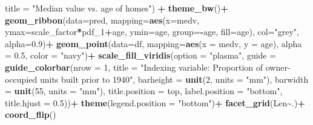 \documentclass[
]{article}
\newenvironment{Shaded}{\begin{snugshade}}{\end{snugshade}}
\newcommand{\AttributeTok}[1]{\textcolor[rgb]{0.13,0.29,0.53}{#1}}
\newcommand{\DecValTok}[1]{\textcolor[rgb]{0.00,0.00,0.81}{#1}}
\newcommand{\FloatTok}[1]{\textcolor[rgb]{0.00,0.00,0.81}{#1}}
\newcommand{\FunctionTok}[1]{\textcolor[rgb]{0.13,0.29,0.53}{\textbf{#1}}}
\newcommand{\NormalTok}[1]{#1}
\newcommand{\SpecialCharTok}[1]{\textcolor[rgb]{0.81,0.36,0.00}{\textbf{#1}}}
\newcommand{\StringTok}[1]{\textcolor[rgb]{0.31,0.60,0.02}{#1}}
\begin{document}
\begin{Shaded}
\begin{Highlighting}[]
       \AttributeTok{title =} \StringTok{"Median value vs. age of homes"}\NormalTok{) }\SpecialCharTok{+}
  \FunctionTok{theme\_bw}\NormalTok{()}\SpecialCharTok{+}
  \FunctionTok{geom\_ribbon}\NormalTok{(}\AttributeTok{data=}\NormalTok{pred,}
              \AttributeTok{mapping=}\FunctionTok{aes}\NormalTok{(}\AttributeTok{x=}\NormalTok{medv, }\AttributeTok{ymax=}\NormalTok{scale\_factor}\SpecialCharTok{*}\NormalTok{pdf\_1}\SpecialCharTok{+}\NormalTok{age, }
                          \AttributeTok{ymin=}\NormalTok{age, }\AttributeTok{group=}\SpecialCharTok{{-}}\NormalTok{age, }\AttributeTok{fill=}\NormalTok{age),}
              \AttributeTok{col=}\StringTok{"grey"}\NormalTok{, }\AttributeTok{alpha=}\FloatTok{0.9}\NormalTok{)}\SpecialCharTok{+}
  \FunctionTok{geom\_point}\NormalTok{(}\AttributeTok{data=}\NormalTok{df,}
             \AttributeTok{mapping=}\FunctionTok{aes}\NormalTok{(}\AttributeTok{x =}\NormalTok{ medv, }\AttributeTok{y =}\NormalTok{ age), }\AttributeTok{alpha =} \FloatTok{0.5}\NormalTok{, }\AttributeTok{color =} \StringTok{"navy"}\NormalTok{)}\SpecialCharTok{+}
  \FunctionTok{scale\_fill\_viridis}\NormalTok{(}\AttributeTok{option =} \StringTok{"plasma"}\NormalTok{,}
                     \AttributeTok{guide =} \FunctionTok{guide\_colorbar}\NormalTok{(}\AttributeTok{nrow =} \DecValTok{1}\NormalTok{,}
                                            \AttributeTok{title =} \StringTok{"Indexing variable: }
\StringTok{                                            Proportion of owner{-}occupied units built }
\StringTok{                                            prior to 1940"}\NormalTok{,}
                                            \AttributeTok{barheight =} \FunctionTok{unit}\NormalTok{(}\DecValTok{2}\NormalTok{, }\AttributeTok{units =} \StringTok{"mm"}\NormalTok{),}
                                            \AttributeTok{barwidth =} \FunctionTok{unit}\NormalTok{(}\DecValTok{55}\NormalTok{, }\AttributeTok{units =} \StringTok{"mm"}\NormalTok{),}
                                            \AttributeTok{title.position =} \StringTok{\textquotesingle{}top\textquotesingle{}}\NormalTok{,}
                                            \AttributeTok{label.position =} \StringTok{"bottom"}\NormalTok{,}
                                            \AttributeTok{title.hjust =} \FloatTok{0.5}\NormalTok{))}\SpecialCharTok{+}
  \FunctionTok{theme}\NormalTok{(}\AttributeTok{legend.position =} \StringTok{"bottom"}\NormalTok{)}\SpecialCharTok{+}
  \FunctionTok{facet\_grid}\NormalTok{(Len}\SpecialCharTok{\textasciitilde{}}\NormalTok{.)}\SpecialCharTok{+}
  \FunctionTok{coord\_flip}\NormalTok{()}
\end{Highlighting}
\end{Shaded}
\end{document}
